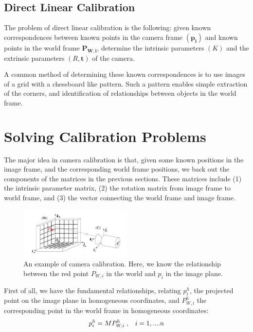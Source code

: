 \documentclass[]{article}
\begin{document}
	
	\subsection{Direct Linear Calibration}
	The problem of direct linear calibration is the following: given known correspondences between known points in the camera frame $(\boldsymbol{p_i})$ and known points in the world frame $\boldsymbol{P_{W,i}}$, determine the intrinsic parameters $(K)$ and the extrinsic parameters $(R,\boldsymbol{t})$ of the camera.
	
	A common method of determining these known correspondences is to use images of a grid with a chessboard like pattern. Such a pattern enables simple extraction of the corners, and identification of relationships between objects in the world frame.
	
	\section{Solving Calibration Problems}
	
	The major idea in camera calibration is that, given some known positions in the image frame, and the corresponding world frame positions, we back out the components of the matrices in the previous sections. These matrices include (1) the intrinsic parameter matrix, (2) the rotation matrix from image frame to world frame, and (3) the vector connecting the world frame and image frame.\\
	
	\begin{figure}[H]
		\includegraphics[width=0.5\textwidth]{vik_image_4.png}
		\centering
		\caption{An example of camera calibration. Here, we know the relationship between the red point $P_{W,i}$ in the world and $p_i$ in the image plane.}
		\label{fig:calibration}
	\end{figure}
	
	
	First of all, we have the fundamental relationships, relating $p_i^h$, the projected point on the image plane in homogeneous coordinates, and $P_{W,i}^h$ the corresponding point in the world frame in homogeneous coordinates:
	\begin{equation}
	p_i^h = M P_{W,i}^{h}\hspace{1mm}, \hspace{3mm}i = 1,....n
	\end{equation}
	
\end{document}
